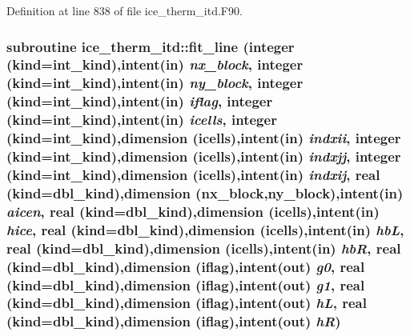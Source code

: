 Definition at line 838 of file ice\_\-therm\_\-itd.F90.\hypertarget{namespaceice__therm__itd_a6eda9b04392b3bc42d5b8cb373e8fc7d}{
\subsubsection[{fit\_\-line}]{\setlength{\rightskip}{0pt plus 5cm}subroutine ice\_\-therm\_\-itd::fit\_\-line (integer (kind=int\_\-kind),intent(in) {\em nx\_\-block}, \/  integer (kind=int\_\-kind),intent(in) {\em ny\_\-block}, \/  integer (kind=int\_\-kind),intent(in) {\em iflag}, \/  integer (kind=int\_\-kind),intent(in) {\em icells}, \/  integer (kind=int\_\-kind),dimension (icells),intent(in) {\em indxii}, \/  integer (kind=int\_\-kind),dimension (icells),intent(in) {\em indxjj}, \/  integer (kind=int\_\-kind),dimension (icells),intent(in) {\em indxij}, \/  real (kind=dbl\_\-kind),dimension (nx\_\-block,ny\_\-block),intent(in) {\em aicen}, \/  real (kind=dbl\_\-kind),dimension (icells),intent(in) {\em hice}, \/  real (kind=dbl\_\-kind),dimension (icells),intent(in) {\em hbL}, \/  real (kind=dbl\_\-kind),dimension (icells),intent(in) {\em hbR}, \/  real (kind=dbl\_\-kind),dimension (iflag),intent(out) {\em g0}, \/  real (kind=dbl\_\-kind),dimension (iflag),intent(out) {\em g1}, \/  real (kind=dbl\_\-kind),dimension (iflag),intent(out) {\em hL}, \/  real (kind=dbl\_\-kind),dimension (iflag),intent(out) {\em hR})}}
\label{namespaceice__therm__itd_a6eda9b04392b3bc42d5b8cb373e8fc7d}


